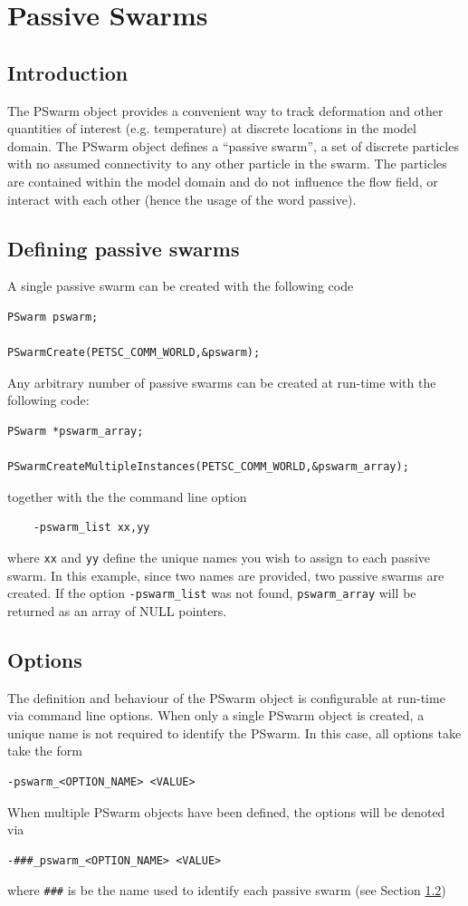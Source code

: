 \documentclass[paper=a4, fontsize=10pt,twoside]{scrartcl}
\begin{document}
{{%

\section{Passive Swarms}
\subsection{Introduction}

The PSwarm object provides a convenient way to track deformation and other quantities of interest (e.g. temperature)
at discrete locations in the model domain.
The PSwarm object defines a ``passive swarm'', a set of discrete particles with no assumed connectivity to
any other particle in the swarm. The particles are contained within the model domain and do not influence the flow field,
or interact with each other (hence the usage of the word passive).

\subsection{Defining passive swarms} \label{sec:def_pswarm}
A single passive swarm can be created with the following code
\begin{lstlisting}
PSwarm pswarm;

PSwarmCreate(PETSC_COMM_WORLD,&pswarm);
\end{lstlisting}

Any arbitrary number of passive swarms can be created at run-time with the following code:
\begin{lstlisting}
PSwarm *pswarm_array;

PSwarmCreateMultipleInstances(PETSC_COMM_WORLD,&pswarm_array);
\end{lstlisting}
together with the the command line option
\begin{lstlisting}
	-pswarm_list xx,yy
\end{lstlisting}
where \texttt{xx} and \texttt{yy} define the unique names you wish to assign to each passive swarm.
In this example, since two names are provided, two passive swarms are created.
If the option \texttt{-pswarm\_list} was not found, \texttt{pswarm\_array} will be returned as an array of NULL pointers.

\subsection{Options}
The definition and behaviour of the PSwarm object is configurable at run-time via command line options.
When only a single PSwarm object is created, a unique name is not required to identify the PSwarm.
In this case, all options take take the form
\begin{lstlisting}
-pswarm_<OPTION_NAME> <VALUE>
\end{lstlisting}
When multiple PSwarm objects have been defined, the options will be denoted via
\begin{lstlisting}
-###_pswarm_<OPTION_NAME> <VALUE>
\end{lstlisting}
where \texttt{\#\#\#} is be the name used to identify each passive swarm (see Section \ref{sec:def_pswarm})

}}
\end{document}

